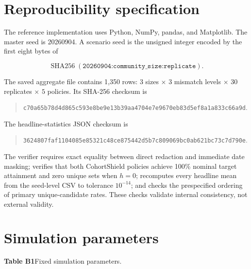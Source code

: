 \documentclass[pdflatex,sn-mathphys-num]{sn-jnl}
\theoremstyle{plain}
\begin{document}
\begin{appendices}

\section{Reproducibility specification}\label{app:repro}

The reference implementation uses Python, NumPy, pandas, and Matplotlib. The master seed is 20260904. A scenario seed is the unsigned integer encoded by the first eight bytes of

\begin{equation}
\operatorname{SHA256}(\texttt{20260904:community\_size:replicate}).
\end{equation}

The saved aggregate file contains 1,350 rows: $3$ sizes $\times$ $3$ mismatch levels $\times$ $30$ replicates $\times$ $5$ policies. Its SHA-256 checksum is

\begin{quote}
\small\texttt{c70a65b78d4d865c593e8be9e13b39aa4704e7e9670eb83d5ef8a1a833c66a9d}.
\end{quote}

The headline-statistics JSON checksum is

\begin{quote}
\small\texttt{3624807faf1104085e85321c48ce875442d5b7c809069bc0ab621bc73c7d790e}.
\end{quote}

The verifier requires exact equality between direct redaction and immediate date masking; verifies that both CohortShield policies achieve 100\% nominal target attainment and zero unique sets when $h=0$; recomputes every headline mean from the seed-level CSV to tolerance $10^{-14}$; and checks the prespecified ordering of primary unique-candidate rates. These checks validate internal consistency, not external validity.

\section{Simulation parameters}\label{app:parameters}

\noindent\textbf{Table B1}\quad Fixed simulation parameters.


\end{appendices}
\end{document}
